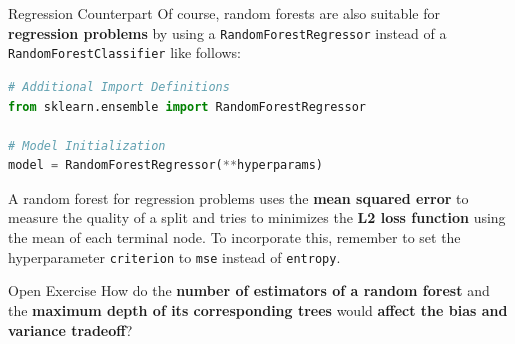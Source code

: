 \documentclass[document.tex]{subfiles}
\begin{document}
    \begin{frame}[fragile]{Regression Counterpart}
        Of course, random forests are also suitable for \textbf{regression problems} by using a \verb|RandomForestRegressor| instead of a \verb|RandomForestClassifier| like follows:

        \begin{lstlisting}[language=Python, style=material]
# Additional Import Definitions
from sklearn.ensemble import RandomForestRegressor

# Model Initialization
model = RandomForestRegressor(**hyperparams)
        \end{lstlisting}

        A random forest for regression problems uses the \textbf{mean squared error} to measure the quality of a split and tries to minimizes the \textbf{L2 loss function} using the mean of each terminal node. To incorporate this, remember to set the hyperparameter \verb|criterion| to \verb|mse| instead of \verb|entropy|.
    \end{frame}

    \begin{frame}{Open Exercise }
        How do the \textbf{number of estimators of a random forest} and the \textbf{maximum depth of its corresponding trees} would \textbf{affect the bias and variance tradeoff}?
    \end{frame}
\end{document}
